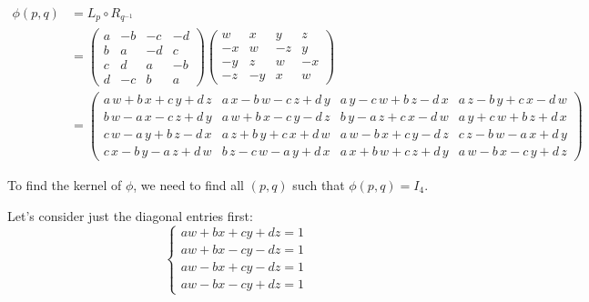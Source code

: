 \documentclass[12pt]{article}
\begin{document}
        \begin{align*}
            \phi(p,q) &= L_p \circ R_{q^{-1}}\\
            &= \begin{pmatrix}
                a & -b & -c & -d \\
                b & a & -d & c \\
                c & d & a & -b \\
                d & -c & b & a
            \end{pmatrix} \begin{pmatrix}
                w & x & y & z \\
                -x & w & -z & y \\
                -y & z & w & -x \\
                -z & -y & x & w
            \end{pmatrix}\\ 
            &= \begin{pmatrix}
                a\,w+b\,x+c\,y+d\,z & a\,x-b\,w-c\,z+d\,y & a\,y-c\,w+b\,z-d\,x & a\,z-b\,y+c\,x-d\,w\\
                b\,w-a\,x-c\,z+d\,y & a\,w+b\,x-c\,y-d\,z & b\,y-a\,z+c\,x-d\,w & a\,y+c\,w+b\,z+d\,x\\
                c\,w-a\,y+b\,z-d\,x & a\,z+b\,y+c\,x+d\,w & a\,w-b\,x+c\,y-d\,z & c\,z-b\,w-a\,x+d\,y\\
                c\,x-b\,y-a\,z+d\,w & b\,z-c\,w-a\,y+d\,x & a\,x+b\,w+c\,z+d\,y & a\,w-b\,x-c\,y+d\,z
            \end{pmatrix}
        \end{align*}
        
        To find the kernel of $\phi$, we need to find all $(p,q)$ such that $\phi(p,q) = I_4$. 

        Let's consider just the diagonal entries first: 
        \[\begin{cases}
            aw + bx + cy + dz = 1\\
            aw + bx - cy - dz = 1\\
            aw - bx + cy - dz = 1\\
            aw - bx - cy + dz = 1
        \end{cases}\]
\end{document}
